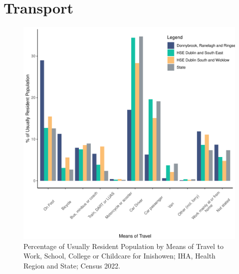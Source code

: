 \documentclass{article}
\begin{document}
\section{Transport}\label{sect:Trans}
\begin{figure}[H]
	\centering
	\includegraphics[width = 120mm]{../figures/TravelED.pdf}
	\caption{Percentage of Usually Resident Population by Means of Travel to Work, School, College or Childcare for Inishowen; IHA, Health Region and State; Census 2022.}
	\label{fig:vbnv}
	\end{figure}
\end{document}
